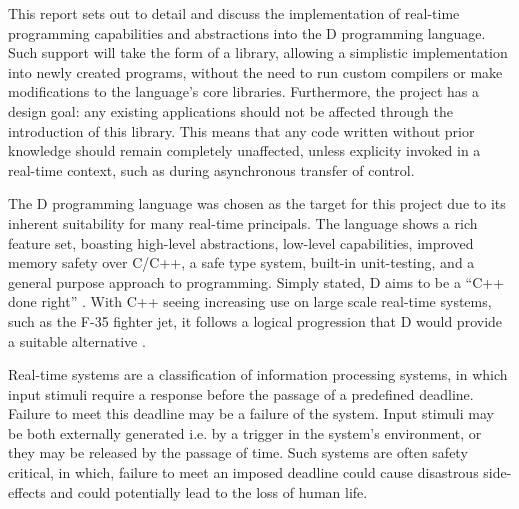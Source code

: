 






This report sets out to detail and discuss the implementation of real-time 
programming capabilities and abstractions into the D programming language. 
Such support will take the form of a library, allowing a simplistic implementation 
into newly created programs, without the need to run custom compilers or make
modifications to the language's core libraries. Furthermore, the project has a design 
goal: any existing applications should not be affected through the introduction 
of this library. This means that any code written without prior knowledge should 
remain completely unaffected, unless explicity invoked in a real-time context,
such as during asynchronous transfer of control. 
\par\bigskip\noindent
The D programming language was chosen as the target for this project due to its 
inherent suitability for many real-time principals. The language shows a rich 
feature set, boasting high-level abstractions, low-level capabilities, 
improved memory safety over C/C++, a safe type 
system, built-in unit-testing,  and a general purpose approach 
to programming. Simply stated, D aims to be a ``C++ done right'' \cite{qznc-tutorial}. 
With C++ seeing increasing use on large scale real-time systems, such as the F-35 
fighter jet, it follows a logical progression that D would provide a suitable 
alternative \cite{f35}.
\par\bigskip\noindent
Real-time systems are a classification of 
information processing systems, in which input
stimuli require a response before the passage of a predefined deadline. Failure 
to meet this deadline may be a failure of the system. Input 
stimuli may be both externally generated i.e. by a trigger in the system's 
environment, or they may be released by the passage of time. Such systems are 
often safety critical, in which, failure to meet an imposed deadline could
cause disastrous side-effects and could potentially lead to the loss of human life. 
